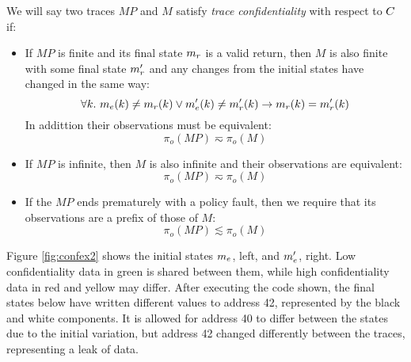 \documentclass[acmsmall,review,anonymous]{acmart}\settopmatter{printfolios=true,printccs=false,printacmref=false}
\begin{document}
We will say two traces $MP$ and $M$ satisfy {\em trace
  confidentiality} with respect to $C$ if:
\begin{itemize}
\item If $MP$ is finite and its final state $m_r$ is a valid
  return, then $M$ is also finite with some final state $m_r'$ and
  any changes from the initial states have changed in the same way:
$$\forall k. ~ m_e(k) \not = m_r(k)
  \vee m_e'(k) \not = m_r'(k) \rightarrow
  m_r(k) = m_r'(k)$$
  In addittion their observations must be equivalent:
  $$\pi_o(MP) \eqsim \pi_o(M)$$
\item If $MP$ is infinite, then $M$ is also infinite and their
  observations are equivalent:
  $$\pi_o(MP) \eqsim \pi_o(M)$$
\item If the $MP$ ends prematurely with a policy fault, then
  we require that its observations are a prefix of those of $M$:
  $$\pi_o(MP) \lesssim \pi_o(M)$$
\end{itemize}

Figure \ref{fig:confex2} shows the initial states \(m_e\), left,
and \(m_e'\), right. Low confidentiality data in green is shared
between them, while high confidentiality data in red and yellow may differ.
After executing the code shown, the final states below have written different
values to address 42, represented by the black and white components.
It is allowed for address 40 to differ between the states due to the initial
variation, but address 42 changed differently between the traces, representing
a leak of data. %
\end{document}
